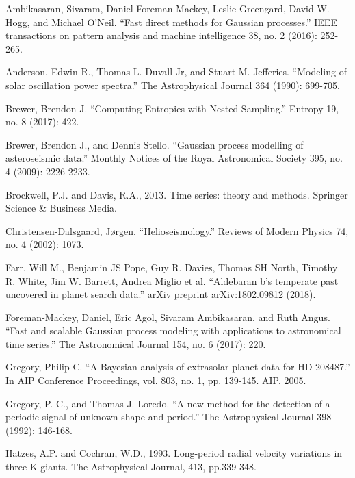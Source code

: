 \documentclass[a4paper, 12pt]{article}
\begin{document}
\begin{thebibliography}{999}

Ambikasaran, Sivaram, Daniel Foreman-Mackey, Leslie Greengard, David W. Hogg, and Michael O’Neil. ``Fast direct methods for Gaussian processes.''
IEEE transactions on pattern analysis and machine intelligence 38, no. 2 (2016): 252-265.

Anderson, Edwin R., Thomas L. Duvall Jr, and Stuart M. Jefferies. ``Modeling of solar oscillation power spectra.'' The Astrophysical Journal 364 (1990): 699-705.

Brewer, Brendon J. ``Computing Entropies with Nested Sampling.'' Entropy 19, no. 8 (2017): 422.

Brewer, Brendon J., and Dennis Stello. ``Gaussian process modelling of asteroseismic data.'' Monthly Notices of the Royal Astronomical Society 395, no. 4 
(2009): 2226-2233.

Brockwell, P.J. and Davis, R.A., 2013. Time series: theory and methods. Springer Science \& Business Media.

Christensen-Dalsgaard, Jørgen. ``Helioseismology.'' Reviews of Modern Physics 74, no. 4 (2002): 1073.

Farr, Will M., Benjamin JS Pope, Guy R. Davies, Thomas SH North, Timothy R. White, Jim W. Barrett, Andrea Miglio et al. ``Aldebaran b's temperate past uncovered in planet search data.'' arXiv preprint arXiv:1802.09812 (2018).

Foreman-Mackey, Daniel, Eric Agol, Sivaram Ambikasaran, and Ruth Angus. ``Fast and scalable Gaussian process modeling with applications to astronomical time series.'' The Astronomical Journal 154, no. 6 (2017): 220.

Gregory, Philip C.
``A Bayesian analysis of extrasolar planet data for HD 208487.''
In AIP Conference Proceedings, vol. 803, no. 1, pp. 139-145. AIP, 2005.

Gregory, P. C., and Thomas J. Loredo. ``A new method for the detection of a periodic signal of unknown shape and period.'' The Astrophysical Journal 398 (1992): 146-168.

Hatzes, A.P. and Cochran, W.D., 1993. Long-period radial velocity variations in three K giants. The Astrophysical Journal, 413, pp.339-348.


\end{thebibliography}
\end{document}
